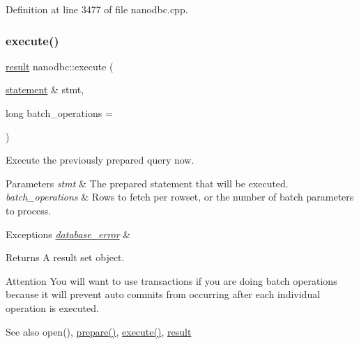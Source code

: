 Definition at line 3477 of file nanodbc.\+cpp.

\mbox{\label{group__mainf_gad178fcf995fa5ac42702607f35e5ba39}} 
\subsubsection{\texorpdfstring{execute()}{execute()}\hspace{0.1cm}{\footnotesize\ttfamily [2/2]}}
{\footnotesize\ttfamily \mbox{\hyperlink{classnanodbc_1_1result}{result}} nanodbc\+::execute (\begin{DoxyParamCaption}\item[{\mbox{\hyperlink{classnanodbc_1_1statement}{statement}} \&}]{stmt,  }\item[{long}]{batch\+\_\+operations = {} }\end{DoxyParamCaption})}



Execute the previously prepared query now. 


\begin{DoxyParams}{Parameters}
{\em stmt} & The prepared statement that will be executed. \\
\hline
{\em batch\+\_\+operations} & Rows to fetch per rowset, or the number of batch parameters to process. \\
\hline
\end{DoxyParams}

\begin{DoxyExceptions}{Exceptions}
{\em \mbox{\hyperlink{classnanodbc_1_1database__error}{database\+\_\+error}}} & \\
\hline
\end{DoxyExceptions}
\begin{DoxyReturn}{Returns}
A result set object. 
\end{DoxyReturn}
\begin{DoxyAttention}{Attention}
You will want to use transactions if you are doing batch operations because it will prevent auto commits from occurring after each individual operation is executed. 
\end{DoxyAttention}
\begin{DoxySeeAlso}{See also}
open(), \mbox{\hyperlink{group__mainf_ga961a75629487f22ebc87d114c5699bc2}{prepare()}}, \mbox{\hyperlink{group__mainf_ga5cbac617a3964611bd16a2fc6f991b83}{execute()}}, \mbox{\hyperlink{classnanodbc_1_1result}{result}} 
\end{DoxySeeAlso}


